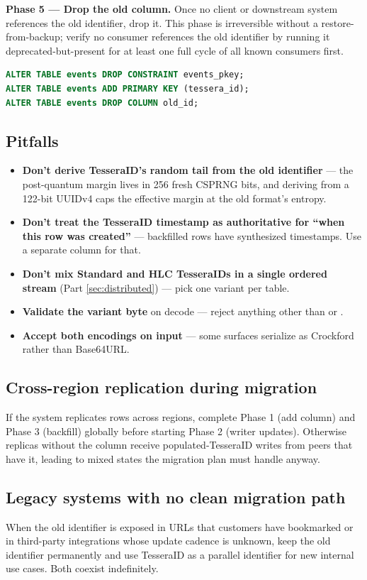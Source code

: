 \textbf{Phase 5 --- Drop the old column.} Once no client or downstream system references the old identifier, drop it. This phase is irreversible without a restore-from-backup; verify no consumer references the old identifier by running it deprecated-but-present for at least one full cycle of all known consumers first.

\begin{lstlisting}[language=SQL,caption={Dropping the old identifier column}]
ALTER TABLE events DROP CONSTRAINT events_pkey;
ALTER TABLE events ADD PRIMARY KEY (tessera_id);
ALTER TABLE events DROP COLUMN old_id;
\end{lstlisting}

\subsection{Pitfalls}

\begin{itemize}
  \item \textbf{Don't derive TesseraID's random tail from the old identifier} --- the post-quantum margin lives in 256 fresh CSPRNG bits, and deriving from a 122-bit UUIDv4 caps the effective margin at the old format's entropy.
  \item \textbf{Don't treat the TesseraID timestamp as authoritative for ``when this row was created''} --- backfilled rows have synthesized timestamps. Use a separate  column for that.
  \item \textbf{Don't mix Standard and HLC TesseraIDs in a single ordered stream} (Part \ref{sec:distributed}) --- pick one variant per table.
  \item \textbf{Validate the variant byte} on decode --- reject anything other than  or .
  \item \textbf{Accept both encodings on input} --- some surfaces serialize as Crockford rather than Base64URL.
\end{itemize}

\subsection{Cross-region replication during migration}

If the system replicates rows across regions, complete Phase 1 (add column) and Phase 3 (backfill) globally before starting Phase 2 (writer updates). Otherwise replicas without the column receive populated-TesseraID writes from peers that have it, leading to mixed states the migration plan must handle anyway.

\subsection{Legacy systems with no clean migration path}

When the old identifier is exposed in URLs that customers have bookmarked or in third-party integrations whose update cadence is unknown, keep the old identifier permanently and use TesseraID as a parallel identifier for new internal use cases. Both coexist indefinitely.
